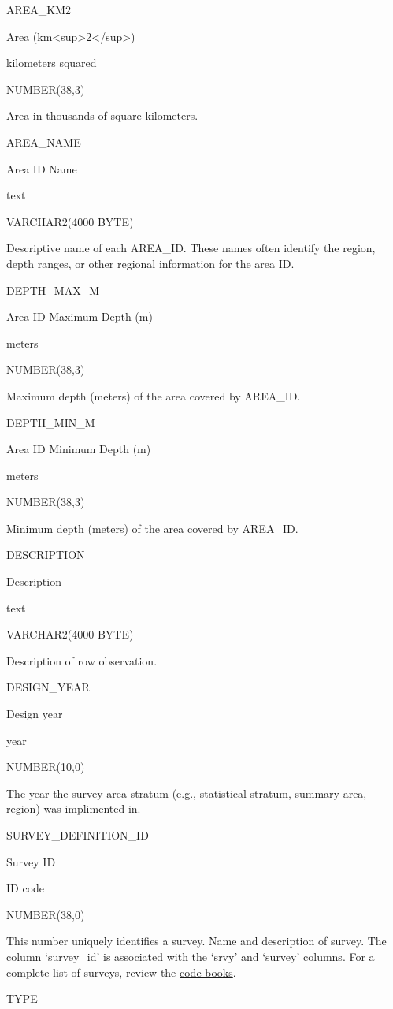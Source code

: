 \documentclass[
  letterpaper,
  oneside,
  open=any]{scrbook}
\begin{document}
AREA\_KM2

Area (km\textless sup\textgreater2\textless/sup\textgreater)

kilometers squared

NUMBER(38,3)

Area in thousands of square kilometers.

AREA\_NAME

Area ID Name

text

VARCHAR2(4000 BYTE)

Descriptive name of each AREA\_ID. These names often identify the
region, depth ranges, or other regional information for the area ID.

DEPTH\_MAX\_M

Area ID Maximum Depth (m)

meters

NUMBER(38,3)

Maximum depth (meters) of the area covered by AREA\_ID.

DEPTH\_MIN\_M

Area ID Minimum Depth (m)

meters

NUMBER(38,3)

Minimum depth (meters) of the area covered by AREA\_ID.

DESCRIPTION

Description

text

VARCHAR2(4000 BYTE)

Description of row observation.

DESIGN\_YEAR

Design year

year

NUMBER(10,0)

The year the survey area stratum (e.g., statistical stratum, summary
area, region) was implimented in.

SURVEY\_DEFINITION\_ID

Survey ID

ID code

NUMBER(38,0)

This number uniquely identifies a survey. Name and description of
survey. The column `survey\_id' is associated with the `srvy' and
`survey' columns. For a complete list of surveys, review the
\href{https://www.fisheries.noaa.gov/resource/document/groundfish-survey-species-code-manual-and-data-codes-manual}{code
books}.

TYPE
\end{document}
